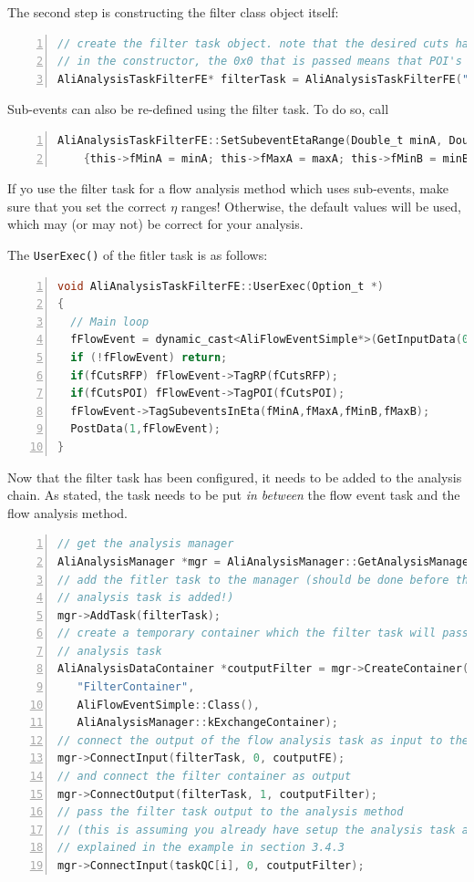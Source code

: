 \documentclass[a4paper]{book}
\numberwithin{equation}{subsection}
\begin{document}
The second step is constructing the filter class object itself:
\begin{lstlisting}[language=C, numbers=left]
// create the filter task object. note that the desired cuts have to be passed 
// in the constructor, the 0x0 that is passed means that POI's will not be filtered
AliAnalysisTaskFilterFE* filterTask = AliAnalysisTaskFilterFE("filter task", filterRP, 0x0);\end{lstlisting}
Sub-events can also be re-defined using the filter task. To do so, call
\begin{lstlisting}[language=C, numbers=left]
AliAnalysisTaskFilterFE::SetSubeventEtaRange(Double_t minA, Double_t maxA, Double_t minB, Double_t maxB)
    {this->fMinA = minA; this->fMaxA = maxA; this->fMinB = minB; this->fMaxB = maxB; }\end{lstlisting}
If yo use the filter task for a flow analysis method which uses sub-events, make sure that you set the correct $\eta$ ranges! Otherwise, the default values will be used, which may (or may not) be correct for your analysis. 

The \texttt{UserExec()} of the fitler task is as follows:
\begin{lstlisting}[language=C, numbers=left]
void AliAnalysisTaskFilterFE::UserExec(Option_t *)
{
  // Main loop
  fFlowEvent = dynamic_cast<AliFlowEventSimple*>(GetInputData(0)); // from TaskSE
  if (!fFlowEvent) return;
  if(fCutsRFP) fFlowEvent->TagRP(fCutsRFP);
  if(fCutsPOI) fFlowEvent->TagPOI(fCutsPOI);
  fFlowEvent->TagSubeventsInEta(fMinA,fMaxA,fMinB,fMaxB);
  PostData(1,fFlowEvent);
}\end{lstlisting}

Now that the filter task has been configured, it needs to be added to the analysis chain. As stated, the task needs to be put \emph{in between} the flow event task and the flow analysis method. 
\begin{lstlisting}[numbers=left, language=C]
// get the analysis manager
AliAnalysisManager *mgr = AliAnalysisManager::GetAnalysisManager();
// add the fitler task to the manager (should be done before the
// analysis task is added!)
mgr->AddTask(filterTask);
// create a temporary container which the filter task will pass to the 
// analysis task
AliAnalysisDataContainer *coutputFilter = mgr->CreateContainer(
   "FilterContainer",
   AliFlowEventSimple::Class(),
   AliAnalysisManager::kExchangeContainer);
// connect the output of the flow analysis task as input to the filter task
mgr->ConnectInput(filterTask, 0, coutputFE);
// and connect the filter container as output
mgr->ConnectOutput(filterTask, 1, coutputFilter);
// pass the filter task output to the analysis method   
// (this is assuming you already have setup the analysis task as
// explained in the example in section 3.4.3
mgr->ConnectInput(taskQC[i], 0, coutputFilter);\end{lstlisting}
\end{document}
